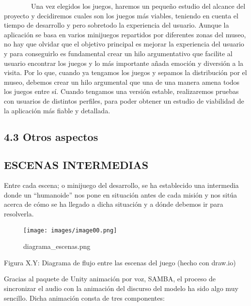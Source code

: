 ~~~~~~~~Una vez elegidos los juegos, haremos un pequeño estudio del
alcance del proyecto y decidiremos cuales son los juegos más viables,
teniendo en cuenta el tiempo de desarrollo y pero sobretodo la
experiencia del usuario. Aunque la aplicación se basa en varios
minijuegos repartidos por diferentes zonas del museo, no hay que olvidar
que el objetivo principal es mejorar la experiencia del usuario y para
conseguirlo es fundamental crear un hilo argumentativo que facilite al
usuario encontrar los juegos y lo más importante añada emoción y
diversión a la visita. Por lo que, cuando ya tengamos los juegos y
sepamos la distribución por el museo, debemos crear un hilo argumental
que una de una manera amena todos los juegos entre sí. Cuando tengamos
una versión estable, realizaremos pruebas con usuarios de distintos
perfiles, para poder obtener un estudio de viabilidad de la aplicación
más fiable y detallada.

\subsection{4.3 Otros aspectos}\label{h.yyppnqmy8a9a}

\subsection{ESCENAS INTERMEDIAS}\label{h.hulp4wa8ygn2}

Entre cada escena; o minijuego del desarrollo, se ha establecido una
intermedia donde un ``humanoide'' nos pone en situación antes de cada
misión y nos sitúa acerca de cómo se ha llegado a dicha situación y a
dónde debemos ir para resolverla.

\begin{figure}[htbp]
\centering
\texttt{[image: images/image00.png]}
\caption{diagrama\_escenas.png}
\end{figure}

Figura X.Y: Diagrama de flujo entre las escenas del juego (hecho con
draw.io)

Gracias al paquete de Unity animación por voz, SAMBA, el proceso de
sincronizar el audio con la animación del discurso del modelo ha sido
algo muy sencillo. Dicha animación consta de tres componentes:

